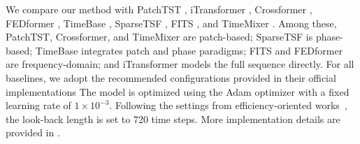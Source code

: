 We compare our method with PatchTST \citeyearpar{nie2023patchtst}, iTransformer \citeyearpar{liu2023itransformer}, Crossformer \citeyearpar{zhang2023crossformer}, FEDformer \citeyearpar{zhou2022fedformer}, TimeBase \citeyearpar{huang2025timebase}, SparseTSF \citeyearpar{lin2024sparsetsf}, FITS \citeyearpar{fits2024}, and TimeMixer \citeyearpar{timemixer24}.
Among these, PatchTST, Crossformer, and TimeMixer are patch-based; SparseTSF is phase-based; TimeBase integrates patch and phase paradigms; FITS and FEDformer are frequency-domain; and iTransformer models the full sequence directly. 
For all baselines, we adopt the recommended configurations provided in their official implementations
The model is optimized using the Adam optimizer with a fixed learning rate of $1 \times 10^{-3}$.  
Following the settings from efficiency-oriented works~\citep{huang2025timebase, lin2024sparsetsf, fits2024}, the look-back length is set to 720 time steps.
More implementation details are provided in .

